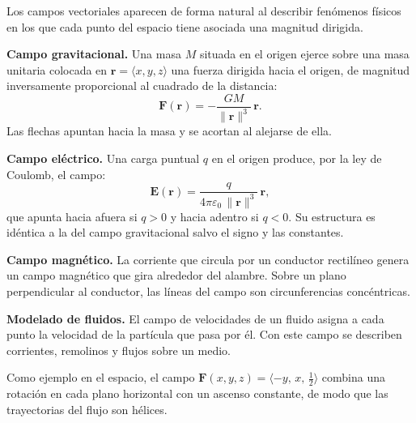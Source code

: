 Los campos vectoriales aparecen de forma natural al describir fenómenos físicos en los que cada punto del espacio tiene asociada una magnitud dirigida.

\textbf{Campo gravitacional.} Una masa $M$ situada en el origen ejerce sobre una masa unitaria colocada en $\mathbf{r} = \langle x, y, z \rangle$ una fuerza dirigida hacia el origen, de magnitud inversamente proporcional al cuadrado de la distancia:
\[
\mathbf{F}(\mathbf{r}) = -\frac{GM}{\|\mathbf{r}\|^3}\, \mathbf{r}.
\]
Las flechas apuntan hacia la masa y se acortan al alejarse de ella.

\textbf{Campo eléctrico.} Una carga puntual $q$ en el origen produce, por la ley de Coulomb, el campo:
\[
\mathbf{E}(\mathbf{r}) = \frac{q}{4\pi\varepsilon_0\, \|\mathbf{r}\|^3}\, \mathbf{r},
\]
que apunta hacia afuera si $q > 0$ y hacia adentro si $q < 0$. Su estructura es idéntica a la del campo gravitacional salvo el signo y las constantes.

\textbf{Campo magnético.} La corriente que circula por un conductor rectilíneo genera un campo magnético que gira alrededor del alambre. Sobre un plano perpendicular al conductor, las líneas del campo son circunferencias concéntricas.

\textbf{Modelado de fluidos.} El campo de velocidades de un fluido asigna a cada punto la velocidad de la partícula que pasa por él. Con este campo se describen corrientes, remolinos y flujos sobre un medio.

Como ejemplo en el espacio, el campo $\mathbf{F}(x, y, z) = \langle -y,\, x,\, \tfrac{1}{2} \rangle$ combina una rotación en cada plano horizontal con un ascenso constante, de modo que las trayectorias del flujo son hélices.

\begin{center}
\shorthandoff{>}
\end{center}

